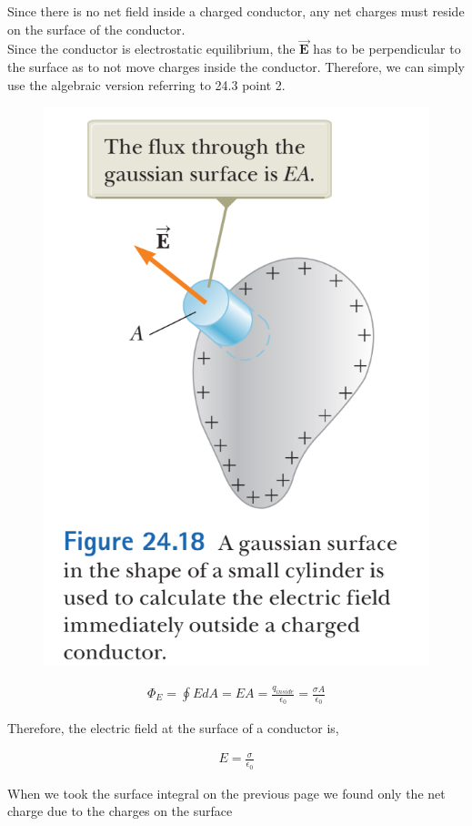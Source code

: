 \documentclass[12pt, titlepage, oneside]{article}
\let\oldvec\vec
\renewcommand{\vec}[1]{\oldvec{\bm{#1}}}
\begin{document}
\noindent Since there is no net field inside a charged conductor, any net charges must reside on the surface of the conductor. 
\\

\noindent Since the conductor is electrostatic equilibrium, the $\vec{E}$ has to be perpendicular to the surface as to not move charges inside the conductor. Therefore, we can simply use the algebraic version referring to 24.3 point 2. 
\begin{figure}
	\begin{center}
		\vspace{-2.5cm}
		\includegraphics[scale=0.5]{9.PNG}
	\end{center}
\end{figure}
\begin{align*}
\Phi_E = \oint EdA = EA = \frac{q_{inside}}{\epsilon_0} = \frac{\sigma A}{\epsilon_0}
\end{align*}

Therefore, the electric field at the surface of a conductor is,

\begin{align*}
	E = \frac{\sigma}{\epsilon_0}
\end{align*}

\noindent
When we took the surface integral on the previous page we found only the net charge due to the charges on the surface
\end{document}
